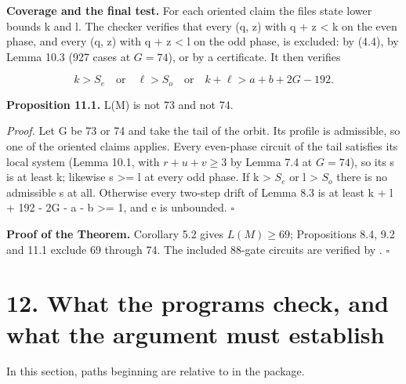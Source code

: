 \textbf{Coverage and the final test.} For each oriented claim the files state lower bounds k and l. The checker verifies that every (q, z) with q + z \textless{} k on the even phase, and every (q, z) with q + z \textless{} l on the odd phase, is excluded: by (4.4), by Lemma 10.3 (927 cases at \(G=74\)), or by a certificate. It then verifies

\[
k>S_e\quad\text{or}\quad\ell>S_o\quad\text{or}\quad k+\ell>a+b+2G-192.
\]

\textbf{Proposition 11.1.} L(M) is not 73 and not 74.

\emph{Proof.} Let G be 73 or 74 and take the tail of the orbit. Its profile is admissible, so one of the oriented claims applies. Every even-phase circuit of the tail satisfies its local system (Lemma 10.1, with \(r+u+v\ge3\) by Lemma 7.4 at \(G=74\)), so its s is at least k; likewise s \textgreater= l at every odd phase. If k \textgreater{} \(S_e\) or l \textgreater{} \(S_o\) there is no admissible s at all. Otherwise every two-step drift of Lemma 8.3 is at least k + l + 192 - 2G - a - b \textgreater= 1, and e is unbounded. \(\square\)

\textbf{Proof of the Theorem.} Corollary 5.2 gives \(L(M)\ge69\); Propositions 8.4, 9.2 and 11.1 exclude 69 through 74. The included 88-gate circuits are verified by \texttt{}. \(\square\)

\hypertarget{what-the-programs-check-and-what-the-argument-must-establish}{%
\section{12. What the programs check, and what the argument must establish}\label{what-the-programs-check-and-what-the-argument-must-establish}}

In this section, paths beginning \texttt{} are relative to \texttt{} in the package.

